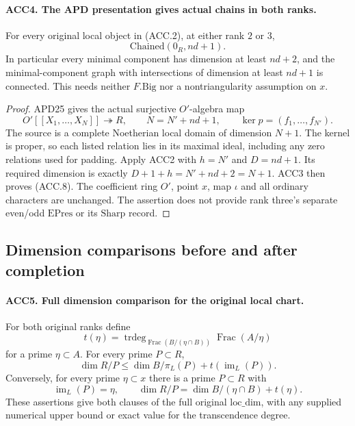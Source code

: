 \documentclass[11pt,a4paper]{article}
\numberwithin{equation}{section}
\theoremstyle{remark}\newtheorem{remark}[theorem]{Remark}
\begin{document}
\paragraph{ACC4. The APD presentation gives actual chains in both ranks.}
\label{claim:ACC4}
For every original local object in (ACC.2), at either rank \(2\)
or \(3\),
\[
                  \mathrm{Chained}(0_R,nd+1).              \tag{ACC.8}
\]
In particular every minimal component has dimension at least
\(nd+2\), and the minimal-component graph with intersections of
dimension at least \(nd+1\) is connected.  This needs neither
\(F.\mathrm{Big}\) nor a nontriangularity assumption on \(x\).

\begin{proof}
APD25 gives the actual surjective \(O'\)-algebra map
\[
 O'[[X_1,\ldots,X_N]]\twoheadrightarrow R,
 \qquad N=N'+nd+1,
 \qquad \ker p=(f_1,\ldots,f_{N'}).                       \tag{ACC.9}
\]
The source is a complete Noetherian local domain of dimension
\(N+1\).  The kernel is proper, so each listed relation lies in
its maximal ideal, including any zero relations used for padding.
Apply ACC2 with \(h=N'\) and \(D=nd+1\).  Its required dimension
is exactly
\(D+1+h=N'+nd+2=N+1\).  ACC3 then proves (ACC.8).
The coefficient ring \(O'\), point \(x\), map \(\iota\) and
all ordinary characters are unchanged.  The assertion does not
provide rank three's separate even/odd \(\mathrm{EPres}\) or
its \(\mathrm{Sharp}\) record.
\end{proof}

\subsection{Dimension comparisons before and after completion}

\paragraph{ACC5. Full dimension comparison for the original local chart.}
\label{claim:ACC5}
For both original ranks define
\[
 t(\eta)=\operatorname{trdeg}_{\operatorname{Frac}(B/(\eta\cap B))}
                              \operatorname{Frac}(A/\eta)
\]
for a prime \(\eta\subset A\).  For every prime \(P\subset R\),
\[
 \dim R/P\le \dim B/\pi_L(P)+t(\operatorname{im}_L(P)).   \tag{ACC.10}
\]
Conversely, for every prime \(\eta\subset x\) there is a prime
\(P\subset R\) with
\[
 \operatorname{im}_L(P)=\eta,
 \qquad \dim R/P=\dim B/(\eta\cap B)+t(\eta).             \tag{ACC.11}
\]
These assertions give both clauses of the full original
\(\mathrm{loc\_\allowbreak dim}\), with any supplied numerical upper bound
or exact value for the transcendence degree.
\end{document}
